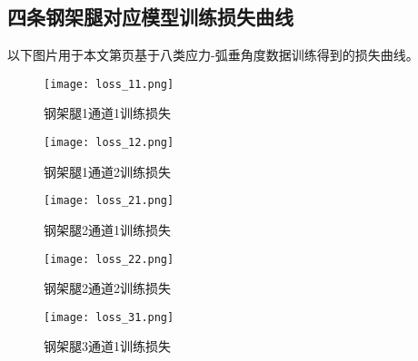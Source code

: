\documentclass[withoutpreface,bwprint]{cumcmthesis}  %
\begin{document}
\begin{appendices}
        \subsection{四条钢架腿对应模型训练损失曲线}
            以下图片用于本文第\pageref{model_train}页基于八类应力-弧垂角度数据训练得到的损失曲线。  
             \begin{figure}[h!] 
            \begin{minipage}{.48\textwidth} %
                \centering  
                \texttt{[image: loss\_11.png]}  
                \caption{钢架腿1通道1训练损失}  
                \label{loss_begin}
            \end{minipage}  
            \hfill %
            \begin{minipage}{.48\textwidth} %
                \centering  
                \texttt{[image: loss\_12.png]}  
                \caption{钢架腿1通道2训练损失}  
            \end{minipage}  
        \end{figure}
        \begin{figure}[h!] 
            \begin{minipage}{.48\textwidth} %
                \centering  
                \texttt{[image: loss\_21.png]}  
                \caption{钢架腿2通道1训练损失}  
            \end{minipage}  
            \hfill %
            \begin{minipage}{.48\textwidth} %
                \centering  
                \texttt{[image: loss\_22.png]}  
                \caption{钢架腿2通道2训练损失}  
            \end{minipage}  
        \end{figure}
        \begin{figure}[h!] 
            \begin{minipage}{.48\textwidth} %
                \centering  
                \texttt{[image: loss\_31.png]}  
                \caption{钢架腿3通道1训练损失}  
            \end{minipage}  
            \hfill %
            \begin{minipage}{.48\textwidth} %
                \centering  

\end{minipage}
\end{figure}
\end{appendices}
\end{document}
